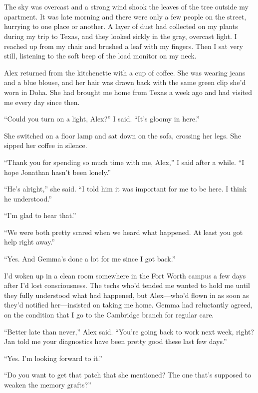 \documentclass[10pt,b5paper]{article}
\begin{document}
\section{}

The sky was overcast and a strong wind shook the leaves of the
tree outside my apartment.  It was late morning and there were
only a few people on the street, hurrying to one place or another.
A layer of dust had collected on my plants during my trip to Texas,
and they looked sickly in the gray, overcast light. I reached up from
my chair and brushed a leaf with my fingers. Then I sat very still,
listening to the soft beep of the load monitor on my neck.

Alex returned from the kitchenette with a cup of coffee. She was
wearing jeans and a blue blouse, and her hair was drawn back with
the same green clip she'd worn in Doha. She had brought me home from
Texas a week ago and had visited me every day since then.

``Could you turn on a light, Alex?'' I said. ``It's gloomy in here.''

She switched on a floor lamp and sat down on the sofa, crossing
her legs.  She sipped her coffee in silence.

``Thank you for spending so much time with me, Alex,'' I said after
a while. ``I hope Jonathan hasn't been lonely.''

``He's alright,'' she said. ``I told him it was important for me to
be here. I think he understood.''

``I'm glad to hear that.''

``We were both pretty scared when we heard what happened. At least
you got help right away.''

``Yes. And Gemma's done a lot for me since I got back.''

I'd woken up in a clean room somewhere in the Fort Worth campus a
few days after I'd lost consciousness. The techs who'd tended me
wanted to hold me until they fully understood what had happened,
but Alex---who'd flown in as soon as they'd notified her---insisted
on taking me home. Gemma had reluctantly agreed, on the condition
that I go to the Cambridge branch for regular care.

``Better late than never,'' Alex said.  ``You're going back to work
next week, right? Jan told me your diagnostics have been pretty good
these last few days.''

``Yes. I'm looking forward to it.''

``Do you want to get that patch that she mentioned? The one that's
supposed to weaken the memory grafts?''
\end{document}
